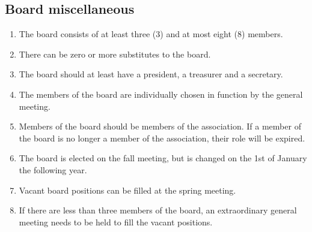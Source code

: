 \subsection{Board miscellaneous}
\begin{enumerate}
  \item The board consists of at least three (3) and at most eight (8) members.
  \item There can be zero or more substitutes to the board.
  \item The board should at least have a president, a treasurer and a secretary.
  \item The members of the board are individually chosen in function by the general meeting.
  \item Members of the board should be members of the association. If a member of the board is no longer a member of the association, their role will be expired.
  \item The board is elected on the fall meeting, but is changed on the 1st of January the following year.
  \item Vacant board positions can be filled at the spring meeting.
  \item If there are less than three members of the board, an extraordinary general meeting needs to be held to fill the vacant positions.
\end{enumerate}

